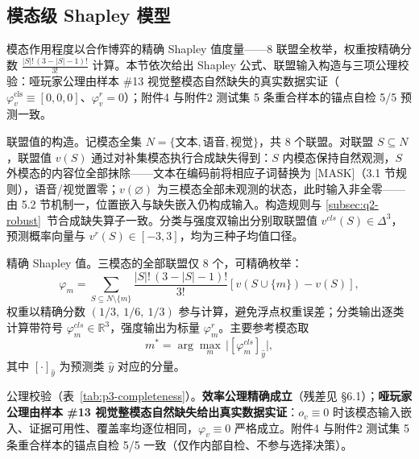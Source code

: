 \documentclass[colorprint,nocoverzero]{gmcmthesis}
\begin{document}
\subsection{模态级 Shapley 模型}\label{subsec:q3-shapley}
模态作用程度以合作博弈的精确 Shapley 值度量——8 联盟全枚举，权重按精确分数 $\tfrac{|S|!\,(3-|S|-1)!}{3!}$ 计算。本节依次给出 Shapley 公式、联盟输入构造与三项公理校验：哑玩家公理由样本 \#13 视觉整模态自然缺失的真实数据实证（$\varphi_v^{\mathrm{cls}}\equiv[0,0,0]$、$\varphi_v^{r}=0$）；附件4 与附件2 测试集 5 条重合样本的锚点自检 5/5 预测一致。

联盟值的构造。记模态全集 $N=\{\text{文本},\text{语音},\text{视觉}\}$，共 8 个联盟。对联盟 $S\subseteq N$，联盟值 $v(S)$ 通过对补集模态执行合成缺失得到：$S$ 内模态保持自然观测，$S$ 外模态的内容位全部抹除——文本在编码前将相应子词替换为 [MASK]（3.1 节规则），语音/视觉置零；$v(\varnothing)$ 为三模态全部未观测的状态，此时输入非全零——由 5.2 节机制一，位置嵌入与缺失嵌入仍构成输入。构造规则与 \ref{subsec:q2-robust}~节合成缺失算子一致。分类与强度双输出分别取联盟值 $v^{cls}(S)\in\Delta^{3}$，预测概率向量与 $v^{r}(S)\in[-3,3]$，均为三种子均值口径。

精确 Shapley 值。三模态的全部联盟仅 8 个，可精确枚举：
\begin{equation}\label{eq:q3-shapley}
\varphi_m=\sum_{S\subseteq N\setminus\{m\}}\frac{|S|!\,(3-|S|-1)!}{3!}\left[v(S\cup\{m\})-v(S)\right],
\end{equation}
权重以精确分数 $(1/3,\ 1/6,\ 1/3)$ 参与计算，避免浮点权重误差；分类输出逐类计算带符号 $\varphi_m^{cls}\in\mathbb{R}^{3}$，强度输出为标量 $\varphi_m^{r}$。主要参考模态取
\begin{equation}\label{eq:q3-refmod}
m^{*}=\arg\max_m\,\bigl|[\varphi_m^{cls}]_{\hat y}\bigr|,
\end{equation}
其中 $[\cdot]_{\hat y}$ 为预测类 $\hat y$ 对应的分量。

公理校验（表~\ref{tab:p3-completeness}）。\textbf{效率公理精确成立}（残差见 §6.1）；\textbf{哑玩家公理由样本 \#13 视觉整模态自然缺失给出真实数据实证}：$o_v\equiv 0$ 时该模态输入嵌入、证据可用性、覆盖率均逐位相同，$\varphi_v\equiv 0$ 严格成立。附件4 与附件2 测试集 5 条重合样本的锚点自检 5/5 一致（仅作内部自检、不参与选择决策）。
\end{document}
